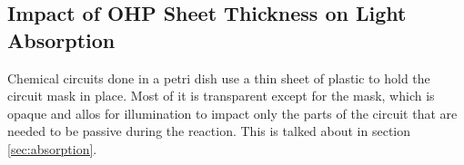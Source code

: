 \subsection{Impact of OHP Sheet Thickness on Light Absorption} \label{sec:ohp-impact}
Chemical circuits done in a petri dish use a thin sheet of plastic to hold the circuit mask in place. Most of it is transparent except for the mask, 
which is opaque and allos for illumination to impact only the parts of the circuit that are needed to be passive during the reaction.
This is talked about in section \ref{sec:absorption}.

